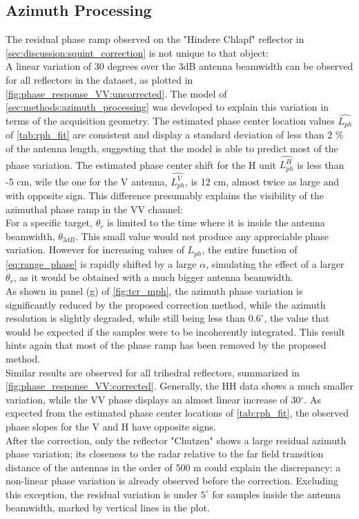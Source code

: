 \subsection{Azimuth Processing}\label{sec:discussion:azimuth_processing}
The residual phase ramp observed on the "Hindere Chlapf" reflector in \autoref{sec:discussion:squint_correction} is not unique to that object:\\ A linear variation of 30 degrees over the 3dB antenna beamwidth can be observed for all reflectors in the dataset, as plotted in \autoref{fig:phase_response_VV:uncorrected}.  The model of \autoref{sec:methods:azimuth_processing} was developed to explain this variation in terms of the acquisition geometry.
The estimated phase center location values $\hat{L_{ph}}$ of \autoref{tab:rph_fit} are consistent and display a standard deviation of less than 2 \% of the antenna length, suggesting that the model is able to predict most of the phase variation. The estimated phase center shift for the H unit $\hat{L_{ph}^{H}}$ is less than -5 cm, wile the one for the V antenna, $\hat{L_{ph}^{V}}$, is 12 cm, almost twice as large and with opposite sign. This difference presumably explains the visibility of the azimuthal phase ramp in the VV channel:\\
For a specific target,  $\theta_r$ is limited to the time where it is inside the antenna beamwidth, $\theta_{3dB}$. This small value would not produce any appreciable phase variation. However for increasing values of $L_{ph}$, the entire function of \autoref{eq:range_phase} is rapidly shifted  by a large $\alpha$, simulating the effect of a larger $\theta_r$, as it would be obtained with a much bigger antenna beamwidth.\\
As shown in panel (g) of \autoref{fig:tcr_mph}, the azimuth phase variation is significantly reduced by the proposed correction method, while the azimuth resolution is slightly degraded, while still being less than $0.6^\circ$, the value that would be expected if the samples were to be incoherently integrated. This result hints again that most of the phase ramp has been removed by the proposed method.\\
Similar results are observed for all trihedral reflectors, summarized in \autoref{fig:phase_response_VV:corrected}.  Generally, the HH data shows a much smaller variation, while the VV phase displays an almost linear increase of 30$^\circ$. As expected from the estimated phase center locations of \autoref{tab:rph_fit}, the observed phase slopes for the V and H have opposite signs.\\  After the correction, only the reflector "Chutzen" shows a large residual azimuth phase variation; its closeness to the radar relative to the far field transition distance of the antennas in the order of 500 m could explain the discrepancy: a non-linear  phase variation is already observed before the correction. Excluding this exception, the residual variation is under $5^\circ$ for samples inside the antenna beamwidth, marked by vertical lines in the plot.
